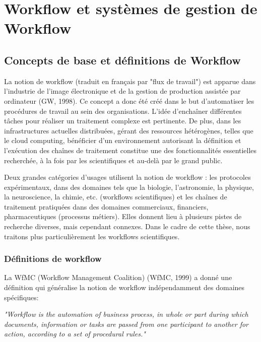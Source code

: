 
 \section{Workflow et systèmes de gestion de Workflow}
 	 
 	 \subsection{ Concepts de base et définitions de Workflow }
 	 
 
La notion de workflow (traduit en français par "flux de travail") est apparue dans l’industrie de l’image électronique et de la gestion de production assistée par ordinateur (GW, 1998). Ce concept a donc été créé dans le but d’automatiser les procédures de travail au sein des organisations. L’idée d’enchaîner différentes tâches pour réaliser un traitement complexe est pertinente. De plus, dans les infrastructures actuelles distribuées, gérant des ressources hétérogènes, telles que le cloud computing, bénéficier d’un environnement autorisant la définition et l’exécution des chaînes de traitement constitue une des fonctionnalités essentielles recherchée, à la fois par les scientifiques et au-delà par le grand public.

Deux grandes catégories d’usages utilisent la notion de workflow : les protocoles expérimentaux, dans des domaines tels que la biologie, l’astronomie, la physique, la neuroscience, la chimie, etc. (workflows scientifiques) et les chaînes de traitement pratiquées dans des domaines commerciaux, financiers, pharmaceutiques (processus métiers). Elles donnent lieu à plusieurs pistes de recherche diverses, mais cependant connexes. Dans le cadre de cette thèse, nous traitons plus particulièrement les workflows scientifiques.

\subsubsection{Définitions de workflow}
La WfMC (Workflow Management Coalition) (WfMC, 1999) a donné une définition qui généralise la notion de workflow indépendamment des domaines spécifiques:

\textit{"Workflow is the automation of business process, in whole or part during which documents, information or tasks are passed from one participant to another for action, according to a set of procedural rules."}

